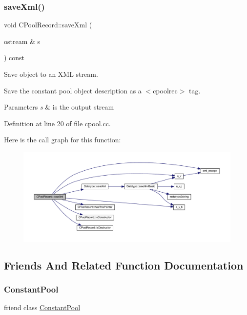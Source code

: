 \subsubsection{\texorpdfstring{saveXml()}{saveXml()}}
{\footnotesize\ttfamily void C\+Pool\+Record\+::save\+Xml (\begin{DoxyParamCaption}\item[{ostream \&}]{s }\end{DoxyParamCaption}) const}



Save object to an X\+ML stream. 

Save the constant pool object description as a $<$cpoolrec$>$ tag. 
\begin{DoxyParams}{Parameters}
{\em s} & is the output stream \\
\hline
\end{DoxyParams}


Definition at line 20 of file cpool.\+cc.

Here is the call graph for this function\+:
\nopagebreak
\begin{figure}[H]
\begin{center}
\leavevmode
\includegraphics[width=350pt]{class_c_pool_record_a3c44a419dc5e21167354c715fadcfa18_cgraph}
\end{center}
\end{figure}


\subsection{Friends And Related Function Documentation}
\mbox{\label{class_c_pool_record_a9082967f4fe2577fe0a80c797675065d}} 
\subsubsection{\texorpdfstring{ConstantPool}{ConstantPool}}
{\footnotesize\ttfamily friend class \mbox{\hyperlink{class_constant_pool}{Constant\+Pool}}\hspace{0.3cm}{\ttfamily [friend]}}




